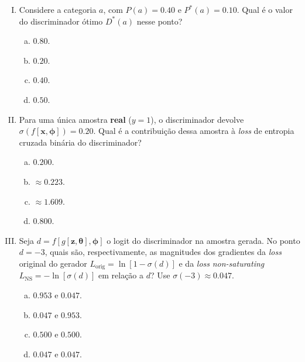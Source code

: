 \documentclass{dlproblemset}
\newcommand{\thetav}{\boldsymbol{\theta}}
\begin{document}
\begin{enumerate}[I)]

\item Considere a categoria $a$, com $P(a) = 0.40$ e $P^{*}(a) = 0.10$. Qual é o valor do discriminador ótimo $D^{*}(a)$ nesse ponto?
\begin{enumerate}[(a)]
    \item $0.80$.
    \item $0.20$.
    \item $0.40$.
    \item $0.50$.
\end{enumerate}

\item Para uma única amostra \textbf{real} ($y = 1$), o discriminador devolve $\sigma(f[\mathbf{x},\boldsymbol{\phi}]) = 0.20$. Qual é a contribuição dessa amostra à \emph{loss} de entropia cruzada binária do discriminador?
\begin{enumerate}[(a)]
    \item $0.200$.
    \item $\approx 0.223$.
    \item $\approx 1.609$.
    \item $0.800$.
\end{enumerate}

\item Seja $d = f[g[\mathbf{z},\thetav],\boldsymbol{\phi}]$ o logit do discriminador na amostra gerada. No ponto $d = -3$, quais são, respectivamente, as magnitudes dos gradientes da \emph{loss} original do gerador $L_{\text{orig}} = \ln[1-\sigma(d)]$ e da \emph{loss} \textit{non-saturating} $L_{\text{NS}} = -\ln[\sigma(d)]$ em relação a $d$? Use $\sigma(-3) \approx 0.047$.
\begin{enumerate}[(a)]
    \item $0.953$ e $0.047$.
    \item $0.047$ e $0.953$.
    \item $0.500$ e $0.500$.
    \item $0.047$ e $0.047$.
\end{enumerate}


\end{enumerate}
\end{document}
